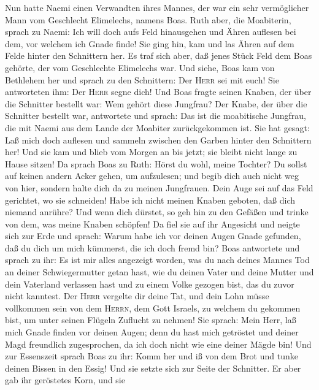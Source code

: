  Nun hatte Naemi einen Verwandten ihres Mannes, der war
ein sehr vermöglicher Mann vom Geschlecht Elimelechs, namens Boas.
 Ruth aber, die Moabiterin, sprach zu Naemi: Ich will doch
aufs Feld hinausgehen und Ähren auflesen bei dem, vor welchem ich Gnade
finde!  Sie ging hin, kam und las Ähren auf dem Felde
hinter den Schnittern her. Es traf sich aber, daß jenes Stück Feld dem
Boas gehörte, der vom Geschlechte Elimelechs war.  Und
siehe, Boas kam von Bethlehem her und sprach zu den Schnittern: Der
\textsc{Herr} sei mit euch! Sie antworteten ihm: Der \textsc{Herr} segne
dich!  Und Boas fragte seinen Knaben, der über die
Schnitter bestellt war: Wem gehört diese Jungfrau?  Der
Knabe, der über die Schnitter bestellt war, antwortete und sprach: Das
ist die moabitische Jungfrau, die mit Naemi aus dem Lande der Moabiter
zurückgekommen ist.  Sie hat gesagt: Laß mich doch
auflesen und sammeln zwischen den Garben hinter den Schnittern her! Und
sie kam und blieb vom Morgen an bis jetzt; sie bleibt nicht lange zu
Hause sitzen!  Da sprach Boas zu Ruth: Hörst du wohl,
meine Tochter? Du sollst auf keinen andern Acker gehen, um aufzulesen;
und begib dich auch nicht weg von hier, sondern halte dich da zu meinen
Jungfrauen.  Dein Auge sei auf das Feld gerichtet, wo sie
schneiden! Habe ich nicht meinen Knaben geboten, daß dich niemand
anrühre? Und wenn dich dürstet, so geh hin zu den Gefäßen und trinke von
dem, was meine Knaben schöpfen!  Da fiel sie auf ihr
Angesicht und neigte sich zur Erde und sprach: Warum habe ich vor deinen
Augen Gnade gefunden, daß du dich um mich kümmerst, die ich doch fremd
bin?  Boas antwortete und sprach zu ihr: Es ist mir alles
angezeigt worden, was du nach deines Mannes Tod an deiner
Schwiegermutter getan hast, wie du deinen Vater und deine Mutter und
dein Vaterland verlassen hast und zu einem Volke gezogen bist, das du
zuvor nicht kanntest.  Der \textsc{Herr} vergelte dir
deine Tat, und dein Lohn müsse vollkommen sein von dem \textsc{Herrn},
dem Gott Israels, zu welchem du gekommen bist, um unter seinen Flügeln
Zuflucht zu nehmen!  Sie sprach: Mein Herr, laß mich
Gnade finden vor deinen Augen; denn du hast mich getröstet und deiner
Magd freundlich zugesprochen, da ich doch nicht wie eine deiner Mägde
bin!  Und zur Essenszeit sprach Boas zu ihr: Komm her und
iß von dem Brot und tunke deinen Bissen in den Essig! Und sie setzte
sich zur Seite der Schnitter. Er aber gab ihr geröstetes Korn, und sie
